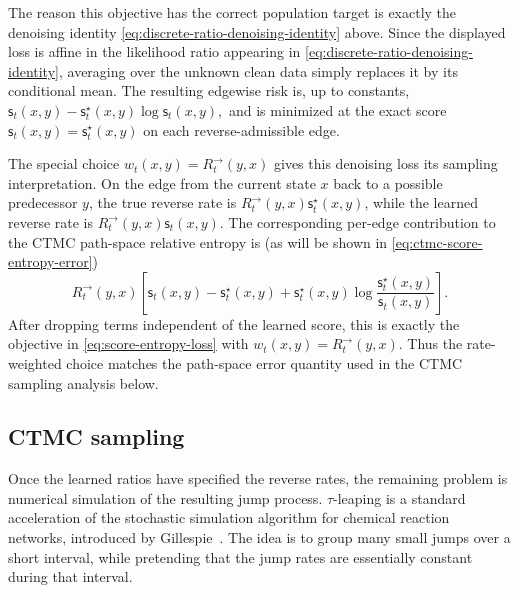 \documentclass{amsart}
\numberwithin{equation}{section}
\theoremstyle{plain}
\theoremstyle{definition}
\theoremstyle{remark}
\newcommand{\sstar}{\mathsf{s}^{\star}}
\newcommand{\score}{\mathsf{s}}
\begin{document}
The reason this objective has the correct population target is exactly the
denoising identity \eqref{eq:discrete-ratio-denoising-identity} above.
Since the displayed loss is affine in the likelihood ratio appearing in \eqref{eq:discrete-ratio-denoising-identity}, averaging
over the unknown clean data simply replaces it by its conditional mean.  The
resulting edgewise risk is, up to constants,
$
    \score_t(x,y)
    -
    \sstar_t(x,y)\log \score_t(x,y),
$
and is minimized at the exact score
$\score_t(x,y)=\sstar_t(x,y)$ on each reverse-admissible edge.

The special choice $w_t(x,y)=R_t^{\to}(y,x)$ gives this denoising loss its
sampling interpretation.  On the edge from the current state $x$ back to a possible
predecessor $y$, the true reverse rate is
$R_t^{\to}(y,x)\sstar_t(x,y)$, while the learned reverse rate is
$R_t^{\to}(y,x)\score_t(x,y)$.  The corresponding per-edge contribution to the
CTMC path-space relative entropy is (as will be shown in \eqref{eq:ctmc-score-entropy-error})
\[
    R_t^{\to}(y,x)\left[
    \score_t(x,y)
    -
    \sstar_t(x,y)
    +
    \sstar_t(x,y)
    \log
    \frac{\sstar_t(x,y)}{\score_t(x,y)}
    \right].
\]
After dropping terms independent of the learned score, this is exactly the
objective in \eqref{eq:score-entropy-loss} with $w_t(x,y)=R_t^{\to}(y,x)$.  Thus
the rate-weighted choice matches the path-space error quantity used in the CTMC
sampling analysis below.

\subsection{CTMC sampling}
\label{subsec:ctmc-sampling}

Once the learned ratios have specified the reverse rates, the remaining problem
is numerical simulation of the resulting jump process.
$\tau$-leaping is a standard acceleration of the stochastic simulation
algorithm for chemical reaction networks, introduced by
Gillespie~\cite{gillespie2001tau}.  The idea is to group many small jumps over a
short interval, while pretending that the jump rates are essentially constant
during that interval.
\end{document}

